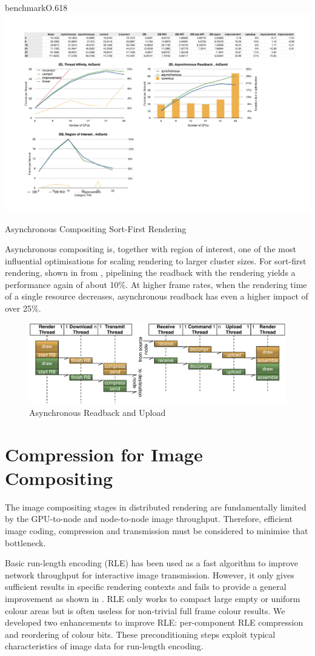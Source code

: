 \begin{wrapfloat}{benchmark}{O}{.618\textwidth}
 \includegraphics[width=.618\textwidth]{results/async}
 {\caption{\label{rAsync}Asynchronous Compositing Sort-First Rendering}}
\end{wrapfloat}

Asynchronous compositing is, together with region of interest, one of the most
influential optimisations for scaling rendering to larger cluster sizes. For
sort-first rendering, shown in  from \cite{EBAHMP:12}, pipelining
the readback with the rendering yields a performance again of about 10\%. At
higher frame rates, when the rendering time of a single resource decreases,
asynchronous readback has even a higher impact of over 25\%.

\begin{figure}[t]\center
  \includegraphics[scale=0.6]{images/asyncReadback}
  \caption{Asynchronous Readback and Upload\label{fAsyncRB}}
\end{figure}


\section{Compression for Image Compositing}

The image compositing stages in distributed rendering are fundamentally limited
by the GPU-to-node and node-to-node image throughput. Therefore, efficient
image coding, compression and transmission must be considered to minimise that
bottleneck.

Basic run-length encoding (RLE) has been used as a fast algorithm to improve
network throughput for interactive image transmission. However, it only gives
sufficient results in specific rendering contexts and fails to provide a
general improvement as shown in \cite{MEP:10}. RLE only works to compact large
empty or uniform colour areas but is often useless for non-trivial full frame
colour results. We developed two enhancements to improve RLE: per-component RLE
compression and reordering of colour bits. These preconditioning steps exploit
typical characteristics of image data for run-length encoding.

